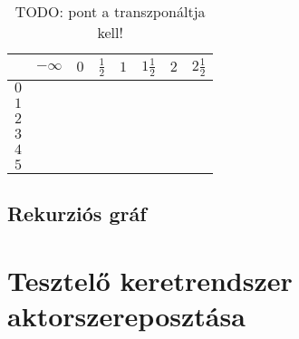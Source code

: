 \documentclass{article}
\newcommand{\nothing}{\text{\raisebox{0.4em}{\rotatebox{180}{$\curvearrowleft$}}}}%
\begin{document}
	\begin{table*}
		\caption{TODO: pont a transzponáltja kell!}
		\centering
		\begin{tabular}{c||c|c|c|c|c|c|c|}
				&	$-\infty$	&	$0$	&	$\frac12$	&	$1$	&	$1\frac12$	&	$2$	&	$2\frac12$\\\hline\hline
			$0$	&	&\nothing	&	\nothing	&	\nothing	&	\nothing	&	\nothing	&	\nothing\\\hline
			$1$	&	&\nothing	&	\nothing	&	\nothing	&	\nothing	&	\nothing	&	\nothing\\\hline
			$2$	&	&\nothing	&	\nothing	&	\nothing	&	\nothing	&	\nothing	&	\nothing\\\hline
			$3$	&	&\nothing	&	\nothing	&	\nothing	&	\nothing	&	\nothing	&	\nothing\\\hline
			$4$	&	&\nothing	&	\nothing	&	\nothing	&	\nothing	&	\nothing	&	\nothing\\\hline
			$5$	&	&\nothing	&	\nothing	&	\nothing	&	\nothing	&	\nothing	&	\nothing\\\hline
		\end{tabular}
	\end{table*}

	\subsection{Rekurziós gráf}

	\section{Tesztelő keretrendszer aktorszereposztása}
\end{document}
